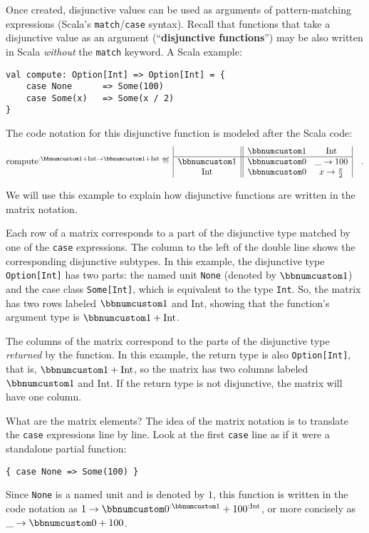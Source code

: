 Once created, disjunctive values can be used as arguments of pattern-matching
expressions (Scala\textsf{'}s \lstinline!match!/\lstinline!case! syntax).
Recall that functions that take a disjunctive value as an argument
(\textsf{``}\textbf{disjunctive functions}\textsf{''})
may be also written in Scala \emph{without} the \lstinline!match!
keyword. A Scala example:
\begin{lstlisting}
val compute: Option[Int] => Option[Int] = {
    case None      => Some(100)
    case Some(x)   => Some(x / 2)
}
\end{lstlisting}
The code notation for this disjunctive function is modeled after the
Scala code:
\[
\text{compute}^{:\bbnum 1+\text{Int}\rightarrow\bbnum 1+\text{Int}}\triangleq\,\begin{array}{|c||cc|}
 & \bbnum 1 & \text{Int}\\
\hline \bbnum 1 & \bbnum 0 & \_\rightarrow100\\
\text{Int} & \bbnum 0 & x\rightarrow\frac{x}{2}
\end{array}\quad.
\]

We will use this example to explain how disjunctive functions are
written in the matrix notation.

Each row of a matrix corresponds to a part of the disjunctive type
matched by one of the \lstinline!case! expressions. The column to
the left of the double line shows the corresponding disjunctive subtypes.
In this example, the disjunctive type \lstinline!Option[Int]! has
two parts: the named unit \lstinline!None! (denoted by $\bbnum 1$)
and the case class \lstinline!Some[Int]!, which is equivalent to
the type \lstinline!Int!. So, the matrix has two rows labeled $\bbnum 1$
and $\text{Int}$, showing that the function\textsf{'}s argument type is $\bbnum 1+\text{Int}$.

The columns of the matrix correspond to the parts of the disjunctive
type \emph{returned} by the function. In this example, the return
type is also \lstinline!Option[Int]!, that is, $\bbnum 1+\text{Int}$,
so the matrix has two columns labeled $\bbnum 1$ and $\text{Int}$.
If the return type is not disjunctive, the matrix will have one column.

What are the matrix elements? The idea of the matrix notation is to
translate the \lstinline!case! expressions line by line. Look at
the first \lstinline!case! line as if it were a standalone partial
function:
\begin{lstlisting}
{ case None => Some(100) }
\end{lstlisting}
Since \lstinline!None! is a named unit and is denoted by $1$, this
function is written in the code notation as $1\rightarrow\bbnum 0^{:\bbnum 1}+100^{:\text{Int}}$,
or more concisely as $\_\rightarrow\bbnum 0+100$. 

